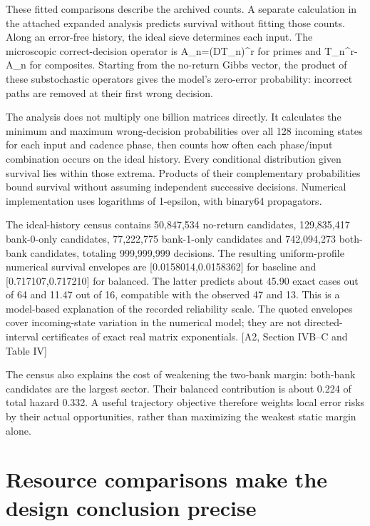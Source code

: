 These fitted comparisons describe the archived counts. A separate calculation in the attached expanded analysis predicts survival without fitting those counts. Along an error-free history, the ideal sieve determines each input. The microscopic correct-decision operator is A\_n=(DT\_n)\^{}r for primes and T\_n\^{}r-A\_n for composites. Starting from the no-return Gibbs vector, the product of these substochastic operators gives the model's zero-error probability: incorrect paths are removed at their first wrong decision.

The analysis does not multiply one billion matrices directly. It calculates the minimum and maximum wrong-decision probabilities over all 128 incoming states for each input and cadence phase, then counts how often each phase/input combination occurs on the ideal history. Every conditional distribution given survival lies within those extrema. Products of their complementary probabilities bound survival without assuming independent successive decisions. Numerical implementation uses logarithms of 1-epsilon, with binary64 propagators.

The ideal-history census contains 50,847,534 no-return candidates, 129,835,417 bank-0-only candidates, 77,222,775 bank-1-only candidates and 742,094,273 both-bank candidates, totaling 999,999,999 decisions. The resulting uniform-profile numerical survival envelopes are {[}0.0158014,0.0158362{]} for baseline and {[}0.717107,0.717210{]} for balanced. The latter predicts about 45.90 exact cases out of 64 and 11.47 out of 16, compatible with the observed 47 and 13. This is a model-based explanation of the recorded reliability scale. The quoted envelopes cover incoming-state variation in the numerical model; they are not directed-interval certificates of exact real matrix exponentials. {[}A2, Section IVB--C and Table IV{]}

The census also explains the cost of weakening the two-bank margin: both-bank candidates are the largest sector. Their balanced contribution is about 0.224 of total hazard 0.332. A useful trajectory objective therefore weights local error risks by their actual opportunities, rather than maximizing the weakest static margin alone.

\section{Resource comparisons make the design conclusion precise}\label{resource-comparisons-make-the-design-conclusion-precise}

